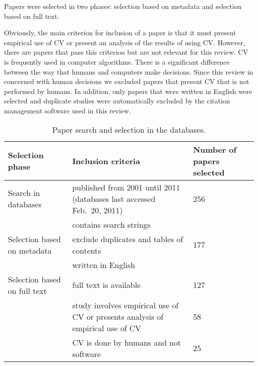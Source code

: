 Papers were selected in two phases: selection based on metadata and selection based on full text.

Obviously, the main criterion for inclusion of a paper is that it must present empirical use of CV or present an analysis of the results of using CV. However, there are papers that pass this criterion but are not relevant for this review. CV is frequently used in computer algorithms. There is a significant difference between the way that humans and computers make decisions. Since this review in concerned with human decisions we excluded papers that present CV that is not performed by humans. In addition, only papers that were written in English were selected and duplicate studies were automatically excluded by the citation management software used in this review.


\begin{table}
\caption{\label{tab:Paper-search-and}Paper search and selection in the databases.}

\begin{tabular}{|>{\raggedright}p{}|>{\raggedright}p{}|>{\raggedright}p{}|}
\hline
Selection phase & Inclusion criteria & Number of papers selected\tabularnewline
\hline \hline

Search in databases & published from 2001 until 2011 (databases last accessed Feb.\ 20, 2011) & 256 \tabularnewline
\cline{2-2}
& contains search strings & \tabularnewline
\hline 

Selection based on metadata & exclude duplicates and tables of contents& 177 \tabularnewline
\cline{2-2}
&  written in English  & \tabularnewline
\hline

Selection based on full text & full text is available & 127 \tabularnewline
\cline{2-3}
& study involves empirical use of CV or presents analysis of empirical use of CV & 58 \tabularnewline
\cline{2-3}
& CV is done by humans and not software & 25 \tabularnewline
\hline
\end{tabular}%
\end{table}


